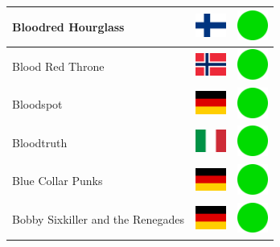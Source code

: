 \documentclass[12pt, a4paper, twoside]{report}
\begin{document}
\begin{center}
\begin{longtable}{|p{5cm}|p{2cm}|p{2cm}|}
 Bloodred Hourglass                                         & \includegraphics[width=1cm]{4x3/fi} &   \includegraphics[width=1cm]{likes/y} \\ \hline
 Blood Red Throne                                           & \includegraphics[width=1cm]{4x3/no} &   \includegraphics[width=1cm]{likes/y} \\ \hline
 Bloodspot                                                  & \includegraphics[width=1cm]{4x3/de} &   \includegraphics[width=1cm]{likes/y} \\ \hline
 Bloodtruth                                                 & \includegraphics[width=1cm]{4x3/it} &   \includegraphics[width=1cm]{likes/y} \\ \hline
 Blue Collar Punks                                          & \includegraphics[width=1cm]{4x3/de} &   \includegraphics[width=1cm]{likes/y} \\ \hline
 Bobby Sixkiller and the Renegades                          & \includegraphics[width=1cm]{4x3/de} &   \includegraphics[width=1cm]{likes/y} \\ \hline

\end{longtable}
\end{center}
\end{document}

